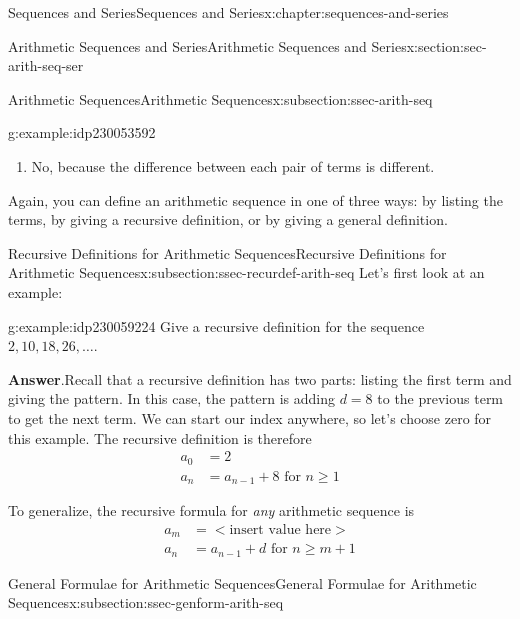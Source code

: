\documentclass[twoside,10pt,]{book}
\newcommand{\blocktitlefont}{\relax}
\numberwithin{equation}{section}
\newcommand{\lt}{<}
\newcommand{\gt}{>}
\newcommand{\amp}{&}
\begin{document}
\begin{chapterptx}{Sequences and Series}{}{Sequences and Series}{}{}{x:chapter:sequences-and-series}
\begin{sectionptx}{Arithmetic Sequences and Series}{}{Arithmetic Sequences and Series}{}{}{x:section:sec-arith-seq-ser}
\begin{subsectionptx}{Arithmetic Sequences}{}{Arithmetic Sequences}{}{}{x:subsection:ssec-arith-seq}
\begin{example}{}{g:example:idp230053592}
\begin{enumerate}[label=(\alph*)]
\item{}No, because the difference between each pair of terms is different.%
\end{enumerate}
\end{example}
%
\par
Again, you can define an arithmetic sequence in one of three ways:  by listing the terms, by giving a recursive definition, or by giving a general definition.%
\end{subsectionptx}
%
%
\typeout{************************************************}
\typeout{************************************************}
%
\begin{subsectionptx}{Recursive Definitions for Arithmetic Sequences}{}{Recursive Definitions for Arithmetic Sequences}{}{}{x:subsection:ssec-recurdef-arith-seq}
Let's first look at an example: \begin{example}{}{g:example:idp230059224}%
Give a recursive definition for the sequence \(2, 10, 18, 26, \ldots\).\par\smallskip%
\noindent\textbf{\blocktitlefont Answer}.\label{g:answer:idp230061400}{}\hypertarget{g:answer:idp230061400}{}\quad{}Recall that a recursive definition has two parts:  listing the first term and giving the pattern.  In this case, the pattern is adding \(d = 8\) to the previous term to get the next term.  We can start our index anywhere, so let's choose zero for this example.  The recursive definition is therefore%
\begin{align*}
a_0 \amp =2\\
a_n \amp = a_{n-1}+8 \text{   for }n\ge 1
\end{align*}
\end{example}
%
\par
To generalize, the recursive formula for \emph{any} arithmetic sequence is%
\begin{align*}
a_m\amp = \lt\text{insert value here}\gt\\
a_n\amp = a_{n-1}+d \text{   for }n\ge m+1
\end{align*}
%
\end{subsectionptx}
%
%
\typeout{************************************************}
\typeout{************************************************}
%
\begin{subsectionptx}{General Formulae for Arithmetic Sequences}{}{General Formulae for Arithmetic Sequences}{}{}{x:subsection:ssec-genform-arith-seq}

\end{subsectionptx}
\end{sectionptx}
\end{chapterptx}
\end{document}
